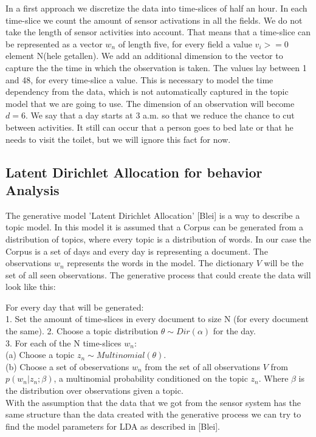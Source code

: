 \documentclass[11pt,a4paper]{article}
\begin{document}
In a first approach we discretize the data into time-slices of half an hour. In each time-slice we count the amount of sensor activations in all the fields. We do not take the length of sensor activities into account. That means that a time-slice can be represented as a vector $w_n$ of length five, for every field a value $v_i>=0$ element N(hele getallen). We add an additional dimension to the vector to capture the the time in which the observation is taken. The values lay between 1 and 48, for every time-slice a value. This is necessary to model the time dependency from the data, which is not automatically captured in the topic model that we are going to use. The dimension of an observation will become $d=6$. We say that a day starts at 3 a.m. so that we reduce the chance to cut between activities. It still can occur that a person goes to bed late or that he needs to visit the toilet, but we will ignore this fact for now.



\subsection{Latent Dirichlet Allocation for behavior Analysis}
The generative model 'Latent Dirichlet Allocation' [Blei] is a way to describe a topic model. In this model it is assumed that a Corpus can be generated from a distribution of topics, where every topic is a distribution of words.
In our case the Corpus is a set of days and every day is representing a document. The observations $w_n$ represents the words in the model. The dictionary $V$ will be the set of all seen observations. The generative process that could create the data will look like this:

For every day that will be generated:\\
1. Set the amount of time-slices in every document to size N (for every document the same).
2. Choose a topic distribution $\theta \sim Dir(\alpha)$ for the day.\\
3. For each of the N time-slices $w_n$:\\
(a) Choose a topic $z_n \sim Multinomial(\theta)$.\\
(b) Choose a set of obeservations $w_n$ from the set of all observations $V$ from $p(w_n |z_n;\beta)$, a multinomial probability conditioned on the topic $z_n$. Where $\beta$ is the distribution over observations given a topic.\\

With the assumption that the data that we got from the sensor system has the same structure than the data created with the generative process we can try to find the model parameters for LDA as described in [Blei].
\end{document}
